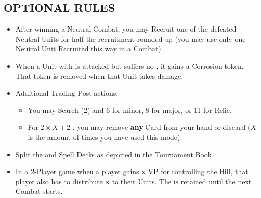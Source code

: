 \begin{multicols}{2}
\subsection*{\MakeUppercase{Optional Rules}}
\begin{itemize}
  \item After winning a Neutral Combat, you may Recruit one of the defeated Neutral Units for half the recruitment  rounded up (you may use only one Neutral Unit Recruited this way in a Combat).  %
  \item When a Unit with  is attacked but suffers no , it gains a Corrosion token. That token is removed when that Unit takes damage.
  \item Additional Trading Post actions:
  \begin{itemize}
    \item You may Search (2)  and  6  for minor, 8  for major, or 11  for Relic.
    \item For $2×X+2$ , you may remove \textbf{any} Card from your hand or discard ($X$is the amount of times you have used this mode).
  \end{itemize}
  \item Split the  and Spell Decks as depicted in the Tournament Book.
  \item In a 2-Player game when a player gains \textbf{x} VP for controlling the Hill, that player also has to distribute \textbf{x}  to their Units. The  is retained until the next Combat starts.
\end{itemize}

\end{multicols}

